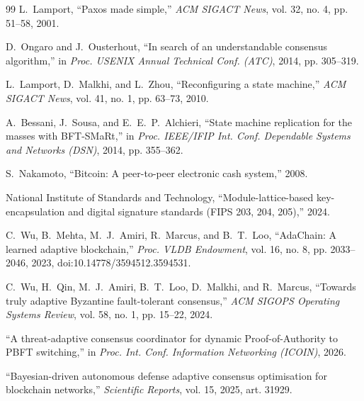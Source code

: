 \documentclass[journal]{IEEEtran}
\theoremstyle{remark}
\begin{document}
\begin{thebibliography}{99}
 L.~Lamport, ``Paxos made simple,'' \emph{ACM SIGACT News}, vol. 32, no. 4,
pp. 51--58, 2001.

 D.~Ongaro and J.~Ousterhout, ``In search of an understandable consensus
algorithm,'' in \emph{Proc. USENIX Annual Technical Conf. (ATC)}, 2014, pp. 305--319.

 L.~Lamport, D.~Malkhi, and L.~Zhou, ``Reconfiguring a state machine,''
\emph{ACM SIGACT News}, vol. 41, no. 1, pp. 63--73, 2010.

 A.~Bessani, J.~Sousa, and E.~E.~P.~Alchieri, ``State machine replication for
the masses with BFT-SMaRt,'' in \emph{Proc. IEEE/IFIP Int. Conf. Dependable Systems and Networks
(DSN)}, 2014, pp. 355--362.

 S.~Nakamoto, ``Bitcoin: A peer-to-peer electronic cash system,'' 2008.

 National Institute of Standards and Technology, ``Module-lattice-based
key-encapsulation and digital signature standards (FIPS 203, 204, 205),'' 2024.

 C.~Wu, B.~Mehta, M.~J.~Amiri, R.~Marcus, and B.~T.~Loo, ``AdaChain: A learned
adaptive blockchain,'' \emph{Proc. VLDB Endowment}, vol. 16, no. 8, pp. 2033--2046, 2023,
doi:10.14778/3594512.3594531.

 C.~Wu, H.~Qin, M.~J.~Amiri, B.~T.~Loo, D.~Malkhi, and R.~Marcus, ``Towards truly
adaptive Byzantine fault-tolerant consensus,'' \emph{ACM SIGOPS Operating Systems Review}, vol. 58,
no. 1, pp. 15--22, 2024.

 ``A threat-adaptive consensus coordinator for dynamic Proof-of-Authority to
PBFT switching,'' in \emph{Proc. Int. Conf. Information Networking (ICOIN)}, 2026.

 ``Bayesian-driven autonomous defense adaptive consensus optimisation for blockchain
networks,'' \emph{Scientific Reports}, vol. 15, 2025, art. 31929.
\end{thebibliography}
\end{document}
